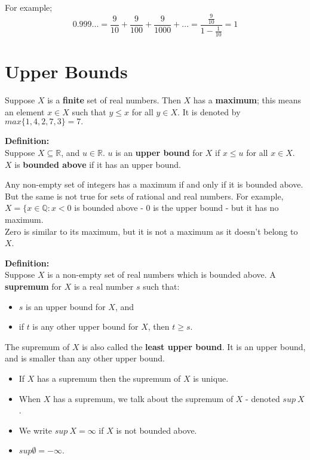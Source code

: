 \documentclass{report}
\newenvironment{frameblue}[1][BlueViolet]
  {\begin{tcolorbox}[colframe=#1,colback=white]}
  {\end{tcolorbox}}
\begin{document}
For example;
\begin{equation*}
    0.999... = \frac{9}{10} + \frac{9}{100} + \frac{9}{1000} +... = \frac{\frac{9}{10}}{1-\frac{1}{10}} = 1
\end{equation*}

\section{Upper Bounds}

Suppose $X$ is a \textbf{finite} set of real numbers. Then $X$ has a \textbf{maximum}; this means an element $x \in X$ such that $y \leq x$ for all $y \in X$. It is denoted by $max\{1,4,2,7,3\} = 7.$\\

\begin{frameblue}
    \textbf{Definition:}\\
    Suppose $X \subseteq \mathbb{R}$, and $u \in \mathbb{R}$. $u$ is an \textbf{upper bound} for $X$ if $x \leq u$ for all $x \in X$.\\
    $X$ is \textbf{bounded above} if it has an upper bound.
\end{frameblue}

Any non-empty set of integers has a maximum if and only if it is bounded above. But the same is not true for sets of rational and real numbers. For example, $X = \{x \in \mathbb{Q} : x < 0$ is bounded above - 0 is the upper bound - but it has no maximum.\\
Zero is similar to its maximum, but it is not a maximum as it doesn't belong to $X$.

\begin{frameblue}
    \textbf{Definition:}\\
    Suppose $X$ is a non-empty set of real numbers which is bounded above. A \textbf{supremum} for $X$ is a real number $s$ such that:
    \begin{itemize}
        \item $s$ is an upper bound for $X$, and
        \item if $t$ is any other upper bound for $X$, then $t \geq s$.
    \end{itemize}
\end{frameblue}

The supremum of $X$ is also called the \textbf{least upper bound}. It is an upper bound, and is smaller than any other upper bound.
\begin{itemize}
    \item If $X$ has a supremum then the supremum of $X$ is unique.
    \item When $X$ has a supremum, we talk about the supremum of $X$ - denoted $sup \: X$.
    \item We write $sup \: X = \infty$ if $X$ is not bounded above.
    \item $sup \emptyset = -\infty$.
\end{itemize}
\end{document}
